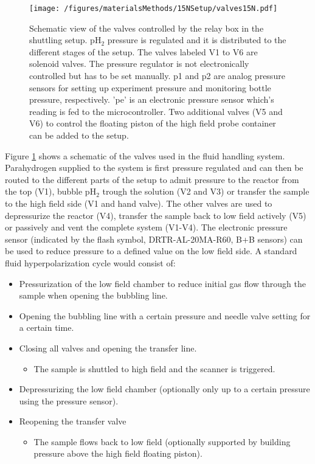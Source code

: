             \begin{figure}
                \texttt{[image: /figures/materialsMethods/15NSetup/valves15N.pdf]}
                \caption[Valve assembly shuttling system]{Schematic view of the valves controlled by the relay box in the shuttling setup. pH$_2$ pressure is regulated and it is distributed to the different stages of the setup. The valves labeled V1 to V6 are solenoid valves. The pressure regulator is not electronically controlled but has to be set manually. p1 and p2 are analog pressure sensors for setting up experiment pressure and monitoring bottle pressure, respectively. 'pe' is an electronic pressure sensor which's reading is fed to the microcontroller. Two additional valves (V5 and V6) to control the floating piston of the high field probe container can be added to the setup.}
                \label{fig:materialsMethods:valveSetup}
            \end{figure}
            Figure \ref{fig:materialsMethods:valveSetup} shows a schematic of the valves used in the fluid handling system. Parahydrogen supplied to the system is first pressure regulated and can then be routed to the different parts of the setup to admit pressure to the reactor from the top (V1), bubble pH$_2$ trough the solution (V2 and V3) or transfer the sample to the high field side (V1 and hand valve). The other valves are used to depressurize the reactor (V4), transfer the sample back to low field actively (V5) or passively  and vent the complete system (V1-V4). The electronic pressure sensor (indicated by the flash symbol, DRTR-AL-20MA-R60, B+B sensors) can be used to reduce pressure to a defined value on the low field side.
            A standard fluid hyperpolarization cycle would consist of: 
            \begin{itemize}
                \item Pressurization of the low field chamber to reduce initial gas flow through the sample when opening the bubbling line.  
                \item Opening the bubbling line with a certain pressure and needle valve setting for a certain time.  
                \item Closing all valves and opening the transfer line. 
                \begin{itemize}
                    \item The sample is shuttled to high field and the scanner is triggered. 
                \end{itemize}
                \item Depressurizing the low field chamber (optionally only up to a certain pressure using the pressure sensor).
                \item Reopening the transfer valve 
                \begin{itemize}
                    \item The sample flows back to low field (optionally supported by building pressure above the high field floating piston).
                \end{itemize}
            \end{itemize}
